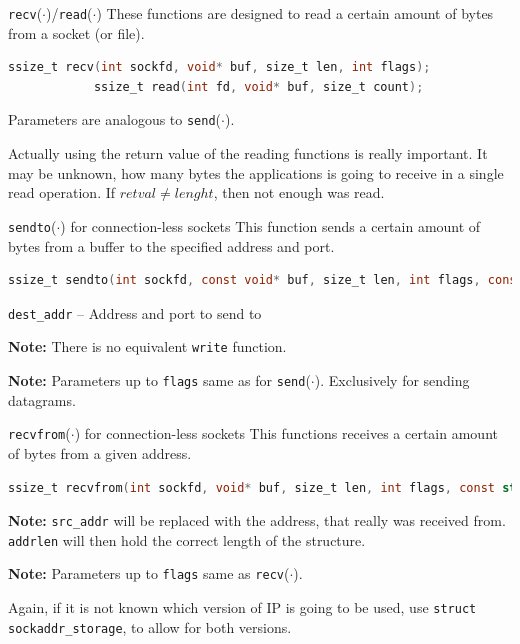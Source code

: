 \documentclass[english]{panikzettel}
\newcommand{\fkt}[1]{\texttt{#1}(\(\cdot\))}
\begin{document}
	\begin{defi}{\fkt{recv}/\fkt{read}}
		These functions are designed to read a certain amount of bytes from a socket (or file).
		\begin{lstlisting}[language=C]
			ssize_t recv(int sockfd, void* buf, size_t len, int flags);
			ssize_t read(int fd, void* buf, size_t count);
		\end{lstlisting}
		\tcblower
		Parameters are analogous to \fkt{send}.
	\end{defi}
	Actually using the return value of the reading functions is really important.
	It may be unknown, how many bytes the applications is going to receive in a single read operation.
	If \( retval \not= lenght \), then not enough was read. 

	\begin{defi}{\fkt{sendto} for connection-less sockets}
		This function sends a certain amount of bytes from a buffer to the specified address and port.
		\begin{lstlisting}[language=C]
			ssize_t sendto(int sockfd, const void* buf, size_t len, int flags, const struct sockaddr *dest_addr, socklen_t addrlen);
		\end{lstlisting}
		\tcblower
		\texttt{dest\_addr} – Address and port to send to 

		\textbf{Note:} There is no equivalent \texttt{write} function.
		
		\textbf{Note:} Parameters up to \texttt{flags} same as for \fkt{send}. 
		Exclusively for sending datagrams.
	\end{defi}

	\begin{defi}{\fkt{recvfrom} for connection-less sockets}
		This functions receives a certain amount of bytes from a given address.
		\begin{lstlisting}[language=C]
			ssize_t recvfrom(int sockfd, void* buf, size_t len, int flags, const struct sockaddr *src_addr, socklen_t *addrlen);
		\end{lstlisting}
		\tcblower
		\textbf{Note:} \texttt{src\_addr} will be replaced with the address, that really was received from. 
		\texttt{addrlen} will then hold the correct length of the structure.

		\textbf{Note:} Parameters up to \texttt{flags} same as \fkt{recv}.
	\end{defi}

	Again, if it is not known which version of IP is going to be used, use \texttt{struct sockaddr\_storage}, to allow for both versions.
\end{document}
